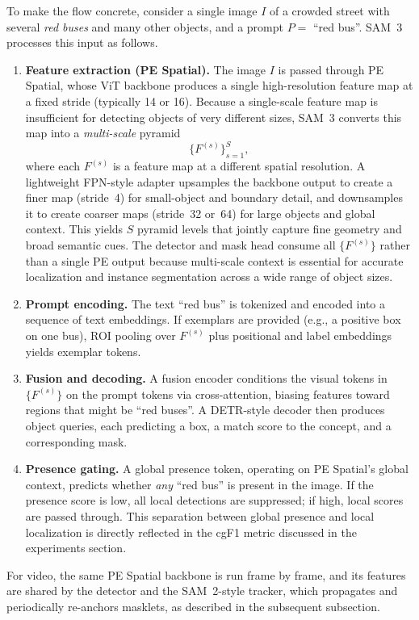 \begin{enrichment}
\begin{enrichment}
		To make the flow concrete, consider a single image $I$ of a crowded street with several \emph{red buses} and many other objects, and a prompt $P =$ ``red bus''. SAM~3 processes this input as follows.
		\begin{enumerate}
			\item \textbf{Feature extraction (PE Spatial).} The image $I$ is passed through PE Spatial, whose ViT backbone produces a single high-resolution feature map at a fixed stride (typically 14 or 16). Because a single-scale feature map is insufficient for detecting objects of very different sizes, SAM~3 converts this map into a \emph{multi-scale} pyramid
			\[
			\{F^{(s)}\}_{s=1}^{S},
			\]
			where each $F^{(s)}$ is a feature map at a different spatial resolution. 
			A lightweight FPN-style adapter upsamples the backbone output to create a finer map (stride~4) for small-object and boundary detail, and downsamples it to create coarser maps (stride~32 or~64) for large objects and global context. This yields $S$ pyramid levels that jointly capture fine geometry and broad semantic cues. 
			The detector and mask head consume all $\{F^{(s)}\}$ rather than a single PE output because multi-scale context is essential for accurate localization and instance segmentation across a wide range of object sizes.
			\item \textbf{Prompt encoding.} The text ``red bus'' is tokenized and encoded into a sequence of text embeddings. If exemplars are provided (e.g., a positive box on one bus), ROI pooling over $F^{(s)}$ plus positional and label embeddings yields exemplar tokens.
			\item \textbf{Fusion and decoding.} A fusion encoder conditions the visual tokens in $\{F^{(s)}\}$ on the prompt tokens via cross-attention, biasing features toward regions that might be ``red buses''. A DETR-style decoder then produces object queries, each predicting a box, a match score to the concept, and a corresponding mask.
			\item \textbf{Presence gating.} A global presence token, operating on PE Spatial’s global context, predicts whether \emph{any} ``red bus'' is present in the image. If the presence score is low, all local detections are suppressed; if high, local scores are passed through. This separation between global presence and local localization is directly reflected in the cgF1 metric discussed in the experiments section.
		\end{enumerate}
		For video, the same PE Spatial backbone is run frame by frame, and its features are shared by the detector and the SAM~2-style tracker, which propagates and periodically re-anchors masklets, as described in the subsequent subsection.
		

\end{enrichment}
\end{enrichment}
